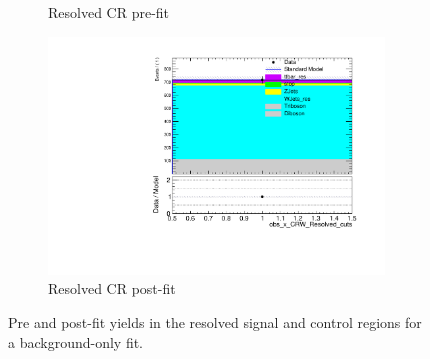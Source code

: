 \begin{figure}[htbp]
\begin{subfigure}{0.49\textwidth}
	     \caption{Resolved CR \wjets pre-fit}
	     \end{subfigure}
	     \begin{subfigure}{0.49\textwidth}
	     \includegraphics[width = 0.98\textwidth]{Figures/5/bkg_only/CRW_Resolved_cuts_afterFit.pdf}
	     \caption{Resolved CR \wjets post-fit}
	     \end{subfigure}

	     \caption{Pre and post-fit yields in the resolved signal and control regions for a background-only fit.}
	     \label{fig:bkg_only_res}
	  \end{figure}

